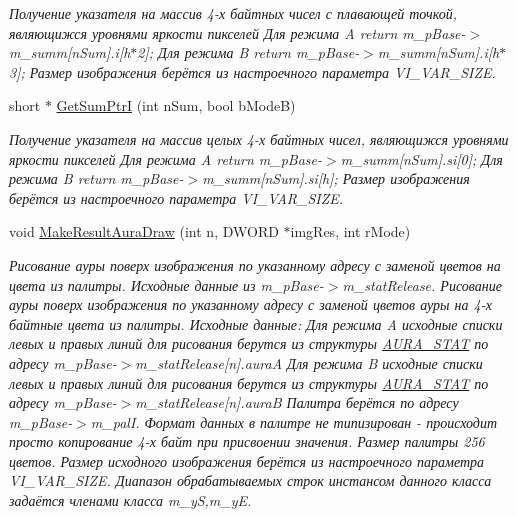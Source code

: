 \begin{DoxyCompactItemize}
\begin{DoxyCompactList}\small\item\em Получение указателя на массив 4-\/х байтных чисел с плавающей точкой, являющижся уровнями яркости пикселей Для режима A return m\+\_\+p\+Base-\/$>$m\+\_\+summ\mbox{[}n\+Sum\mbox{]}.i\mbox{[}h$\ast$2\mbox{]}; Для режима B return m\+\_\+p\+Base-\/$>$m\+\_\+summ\mbox{[}n\+Sum\mbox{]}.i\mbox{[}h$\ast$3\mbox{]}; Размер изображения берётся из настроечного параметра V\+I\+\_\+\+V\+A\+R\+\_\+\+S\+I\+Z\+E. \end{DoxyCompactList}\item 
short $\ast$ \hyperlink{class_c_v_i_engine_thread_ac9185cf585d0d141ccd42b7891020776}{Get\+Sum\+Ptr\+I} (int n\+Sum, bool b\+Mode\+B)
\begin{DoxyCompactList}\small\item\em Получение указателя на массив целых 4-\/х байтных чисел, являющижся уровнями яркости пикселей Для режима A return m\+\_\+p\+Base-\/$>$m\+\_\+summ\mbox{[}n\+Sum\mbox{]}.si\mbox{[}0\mbox{]}; Для режима B return m\+\_\+p\+Base-\/$>$m\+\_\+summ\mbox{[}n\+Sum\mbox{]}.si\mbox{[}h\mbox{]}; Размер изображения берётся из настроечного параметра V\+I\+\_\+\+V\+A\+R\+\_\+\+S\+I\+Z\+E. \end{DoxyCompactList}\item 
void \hyperlink{class_c_v_i_engine_thread_ae6cccc248ff3e63ee357ec6453f2ce4b}{Make\+Result\+Aura\+Draw} (int n, D\+W\+O\+R\+D $\ast$img\+Res, int r\+Mode)
\begin{DoxyCompactList}\small\item\em Рисование ауры поверх изображения по указанному адресу с заменой цветов на цвета из палитры. Исходные данные из m\+\_\+p\+Base-\/$>$m\+\_\+stat\+Release. Рисование ауры поверх изображения по указанному адресу с заменой цветов ауры на 4-\/х байтные цвета из палитры. Исходные данные\+: Для режима A исходные списки левых и правых линий для рисования берутся из структуры \hyperlink{class_a_u_r_a___s_t_a_t}{A\+U\+R\+A\+\_\+\+S\+T\+A\+T} по адресу m\+\_\+p\+Base-\/$>$m\+\_\+stat\+Release\mbox{[}n\mbox{]}.aura\+A Для режима B исходные списки левых и правых линий для рисования берутся из структуры \hyperlink{class_a_u_r_a___s_t_a_t}{A\+U\+R\+A\+\_\+\+S\+T\+A\+T} по адресу m\+\_\+p\+Base-\/$>$m\+\_\+stat\+Release\mbox{[}n\mbox{]}.aura\+B Палитра берётся по адресу m\+\_\+p\+Base-\/$>$m\+\_\+pal\+I. Формат данных в палитре не типизирован -\/ происходит просто копирование 4-\/х байт при присвоении значения. Размер палитры 256 цветов. Размер исходного изображения берётся из настроечного параметра V\+I\+\_\+\+V\+A\+R\+\_\+\+S\+I\+Z\+E. Диапазон обрабатываемых строк инстансом данного класса задаётся членами класса m\+\_\+y\+S,m\+\_\+y\+E. \end{DoxyCompactList}\item 

\end{DoxyCompactItemize}
